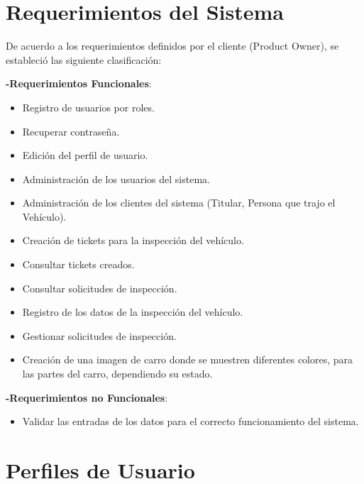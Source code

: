 \section{Requerimientos del Sistema } 
\setlength{\parskip}{5mm}
	De acuerdo a los requerimientos definidos por el cliente (Product Owner), se estableció las siguiente clasificación:

	\textbf{-Requerimientos Funcionales}: 

	\begin{itemize}
		\item Registro de usuarios por roles.
		\item Recuperar contraseña.
		\item Edición del perfil de usuario.
		\item Administración de los usuarios del sistema.
		\item Administración de los clientes del sistema (Titular, Persona que trajo el Vehículo).
		\item Creación de tickets para la inspección del vehículo.
		\item Consultar tickets creados.
		\item Consultar solicitudes de inspección.
		\item Registro de los datos de la inspección del vehículo.
		\item Gestionar solicitudes de inspección.
		\item Creación de una imagen de carro donde se muestren diferentes colores, para las partes del carro, dependiendo su estado.
	\end{itemize}

	\textbf{-Requerimientos no Funcionales}: 

	\begin{itemize}
		\item Validar las entradas de los datos para el correcto funcionamiento del sistema.
	\end{itemize}

\setlength{\parskip}{0mm}


\section{Perfiles de Usuario} 
\setlength{\parskip}{5mm}

